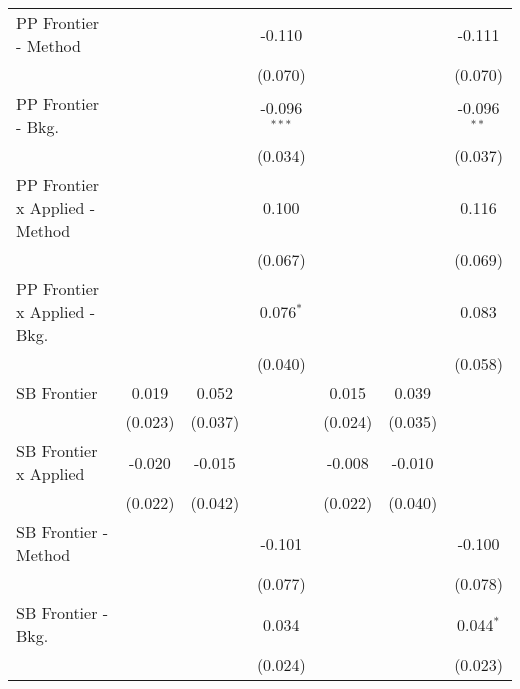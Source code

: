 \begin{tabular}{lcccccc}
   PP Frontier - Method           &              &              & -0.110         &              &              & -0.111\\   
                                  &              &              & (0.070)        &              &              & (0.070)\\   
   PP Frontier - Bkg.             &              &              & -0.096$^{***}$ &              &              & -0.096$^{**}$\\   
                                  &              &              & (0.034)        &              &              & (0.037)\\   
   PP Frontier x Applied - Method &              &              & 0.100          &              &              & 0.116\\   
                                  &              &              & (0.067)        &              &              & (0.069)\\   
   PP Frontier x Applied - Bkg.   &              &              & 0.076$^{*}$    &              &              & 0.083\\   
                                  &              &              & (0.040)        &              &              & (0.058)\\   
   SB Frontier                    & 0.019        & 0.052        &                & 0.015        & 0.039        &   \\   
                                  & (0.023)      & (0.037)      &                & (0.024)      & (0.035)      &   \\   
   SB Frontier x Applied          & -0.020       & -0.015       &                & -0.008       & -0.010       &   \\   
                                  & (0.022)      & (0.042)      &                & (0.022)      & (0.040)      &   \\   
   SB Frontier - Method           &              &              & -0.101         &              &              & -0.100\\   
                                  &              &              & (0.077)        &              &              & (0.078)\\   
   SB Frontier - Bkg.             &              &              & 0.034          &              &              & 0.044$^{*}$\\   
                                  &              &              & (0.024)        &              &              & (0.023)\\   

\end{tabular}
